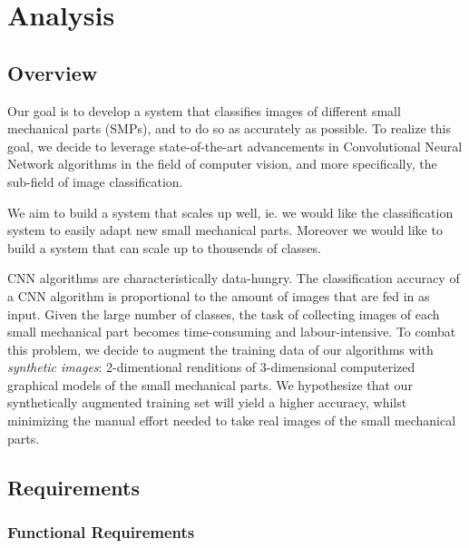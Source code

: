 \chapter{Analysis}


\section{Overview}

Our goal is to develop a system that classifies images of different small mechanical parts (SMPs), and to do so as accurately as possible. To realize this goal, we decide to leverage state-of-the-art advancements in Convolutional Neural Network algorithms in the field of computer vision, and more specifically, the sub-field of image classification.

We aim to build a system that scales up well, ie. we would like the classification system to easily adapt new small mechanical parts. Moreover we would like to build a system that can scale up to thousends of classes.

CNN algorithms are characteristically data-hungry. The classification accuracy of a CNN algorithm is proportional to the amount of images that are fed in as input. Given the large number of classes, the task of collecting images of each small mechanical part becomes time-consuming and labour-intensive. To combat this problem, we decide to augment the training data of our algorithms with \textit{synthetic images}: 2-dimentional renditions of 3-dimensional computerized graphical models of the small mechanical parts. We hypothesize that our synthetically augmented training set will yield a higher accuracy, whilst minimizing the manual effort needed to take real images of the small mechanical parts.

\section{Requirements}

\subsection{Functional Requirements}

